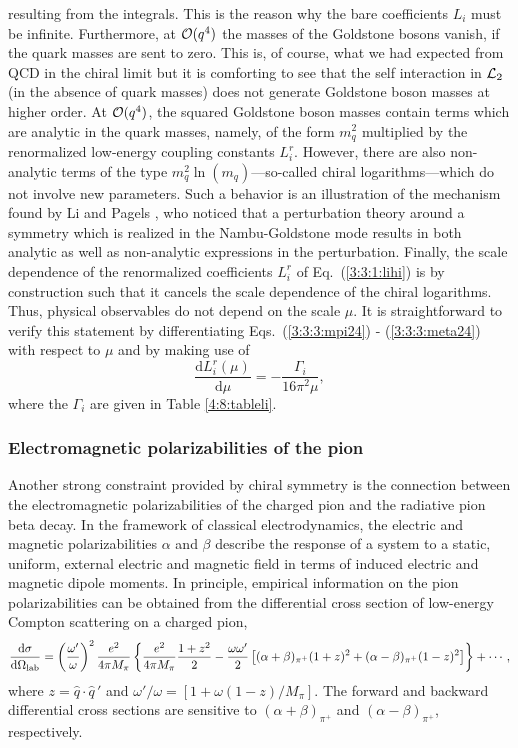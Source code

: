 \documentclass[twoside,12pt]{article}
\begin{document}
resulting from the integrals.
   This is the reason why the bare coefficients $L_i$ must be infinite.
   Furthermore, at ${\cal O}(q^4)$ the masses of the Goldstone bosons
vanish, if the quark masses are sent to zero.
   This is, of course, what we had expected from QCD in the chiral limit
but it is comforting to see that the self interaction in ${\cal L}_2$
(in the absence of quark masses) does not generate Goldstone
boson masses at higher order.
   At ${\cal O}(q^4)$, the squared Goldstone boson masses contain terms
which are analytic in the quark masses, namely, of the form $m^2_q$
multiplied by the renormalized low-energy coupling constants $L_i^r$.
   However, there are also non-analytic terms  of the
type $m^2_q \ln(m_q)$---so-called  chiral logarithms---which do not involve
new parameters.
   Such a behavior is an illustration of the mechanism found by Li and
Pagels \cite{Li:1971vr}, who noticed that a perturbation theory
around a symmetry which is realized in the Nambu-Goldstone mode
results in both analytic as well as non-analytic expressions in
the perturbation.
   Finally, the scale dependence of the renormalized coefficients
$L_i^r$ of Eq.\ (\ref{3:3:1:lihi}) is by construction such that it cancels
the scale dependence of the chiral logarithms.
   Thus, physical observables do not depend on the scale $\mu$.
   It is straightforward to verify this statement by differentiating
Eqs.\ (\ref{3:3:3:mpi24}) - (\ref{3:3:3:meta24}) with respect to $\mu$
and by making use of
$$
\frac{\mbox{d} L_i^r(\mu)}{\mbox{d}\mu}=-\frac{\Gamma_i}{16\pi^2\mu},
$$
where the $\Gamma_i$ are given in Table \ref{4:8:tableli}.


\subsubsection{Electromagnetic polarizabilities of the pion}
\label{sec:2}

   Another strong constraint provided by chiral symmetry is the connection
between the electromagnetic polarizabilities of the charged pion and
the radiative pion beta decay.
   In the framework of classical electrodynamics, the electric and magnetic
polarizabilities $\alpha$ and $\beta$ describe the response of a system to a
static, uniform, external electric and magnetic field in terms of induced
electric and magnetic dipole moments.
   In principle, empirical information on the pion polarizabilities can be obtained
from the differential cross section of low-energy Compton scattering on a charged
pion,
\begin{displaymath}
\frac{\mbox{d}\sigma}{\mbox{d}\Omega_{\rm lab}}= \left(\frac{\omega'}{\omega}\right)^2
\frac{e^2}{4\pi M_\pi}\left\{\frac{e^2}{4\pi M_\pi}
\frac{1+z^2}{2}-\frac{\omega\omega'}{2} \left[(\alpha+\beta)_{\pi^+}(1+z)^2
+(\alpha-\beta)_{\pi^+}(1-z)^2\right]\right\}
+\cdots,
\end{displaymath}
where $z=\hat{q}\cdot\hat{q}\,'$ and $\omega'/\omega=[1+\omega(1-z)/M_\pi]$.
   The forward and backward differential cross sections are
sensitive to $(\alpha+\beta)_{\pi^+}$ and $(\alpha-\beta)_{\pi^+}$, respectively.
\end{document}
